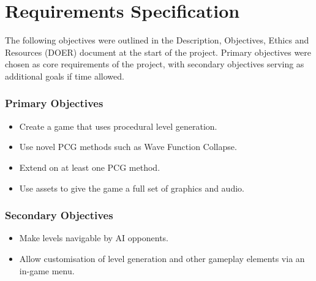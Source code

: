 \chapter{Requirements Specification}
The following objectives were outlined in the Description, Objectives, Ethics and Resources (DOER) document at the start of the project. Primary objectives were chosen as core requirements of the project, with secondary objectives serving as additional goals if time allowed.
\subsection*{Primary Objectives}
\begin{itemize}
    \item Create a game that uses procedural level generation.
    \item Use novel PCG methods such as Wave Function Collapse.
    \item Extend on at least one PCG method.
    \item Use assets to give the game a full set of graphics and audio.
\end{itemize}
\subsection*{Secondary Objectives}
\begin{itemize}
    \item Make levels navigable by AI opponents.
    \item Allow customisation of level generation and other gameplay elements via an in-game menu.
\end{itemize}
